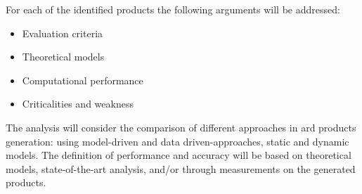 For each of the identified products the following arguments will be addressed:
    \begin{itemize}
    	\item Evaluation criteria
    	\item Theoretical models
        \item Computational performance       
        \item Criticalities and weakness
    \end{itemize}

The analysis will consider the comparison of different approaches in \acs{ard} products generation: using model-driven and data driven-approaches, static and dynamic models. The definition of performance and accuracy will be based on theoretical models, state-of-the-art analysis, and/or through measurements on the generated products.




















